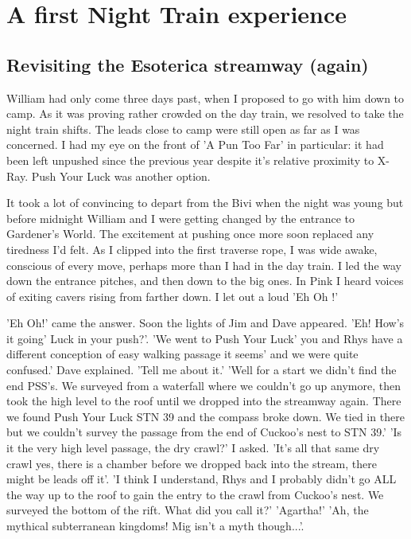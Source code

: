 \section{A first Night Train experience}
\begin{marginfigure}
\end{marginfigure}

\subsection{Revisiting the Esoterica streamway (again)}
William had only come three days past, when I proposed to go with him down to camp. As it was proving rather crowded on the day train, we resolved to take the night train shifts. The leads close to camp were still open as far as I was concerned. I had my eye on the front of 'A Pun Too Far' in particular: it had been left unpushed since the previous year despite it's relative proximity to X-Ray. Push Your Luck was another option. 

It took a lot of convincing to depart from the Bivi when the night was young but before midnight William and I were getting changed by the entrance to Gardener's World. The excitement at pushing once more soon replaced any tiredness I'd felt. As I clipped into the first traverse rope, I was wide awake, conscious of every move, perhaps more than I had in the day train. I led the way down the entrance pitches, and then down to the big ones. In Pink I heard voices of exiting cavers rising from farther down. I let out a loud 'Eh Oh !'

 'Eh Oh!' came the answer. Soon the lights of Jim and Dave appeared. 'Eh! How's it going' Luck in your push?'. 
'We went to Push Your Luck'  you and Rhys have a different conception of easy walking passage it seems' and we were quite confused.' Dave explained.
'Tell me about it.'
'Well for a start we didn't find the end PSS's. We surveyed from a waterfall where we couldn't go up anymore, then took the high level to the roof until we dropped into the streamway again. There we found Push Your Luck STN 39 and the compass broke down. We tied in there but we couldn't survey the passage from the end of Cuckoo's nest to STN 39.'
 'Is it the very high level passage, the dry crawl?' I asked. 
'It's all that same dry crawl yes, there is a chamber before we dropped back into the stream, there might be leads off it'. 
'I think I understand, Rhys and I probably didn't go ALL the way up to the roof to gain the entry to the crawl from Cuckoo's nest. We surveyed the bottom of the rift. What did you call it?'
'Agartha!'
'Ah, the mythical subterranean kingdoms! Mig isn't a myth though...'.

